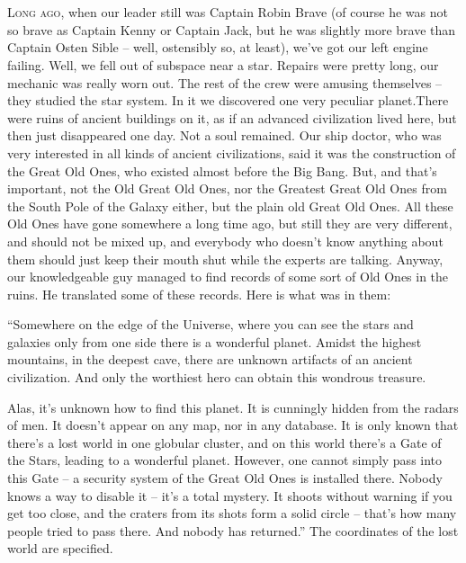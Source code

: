 \documentclass[ebook,twoside,final,openright]{memoir}
\begin{document}
\chapter{}
\par
\lettrine{L}{ong ago,} when our leader still was Captain Robin Brave (of course he was not so brave as Captain Kenny or Captain Jack, but he was slightly more brave than Captain Osten Sible – well, ostensibly so, at least), we’ve got our left engine failing. Well, we fell out of subspace near a star. Repairs were pretty long, our mechanic was really worn out. The rest of the crew were amusing themselves – they studied the star system. In it we discovered one very peculiar planet.There were ruins of ancient buildings on it, as if an advanced civilization lived here, but then just disappeared one day. Not a soul remained. Our ship doctor, who was very interested in all kinds of ancient civilizations, said it was the construction of the Great Old Ones, who existed almost before the Big Bang. But, and that’s important, not the Old Great Old Ones, nor the Greatest Great Old Ones from the South Pole of the Galaxy either, but the plain old Great Old Ones. All these Old Ones have gone somewhere a long time ago, but still they are very different, and should not be mixed up, and everybody who doesn’t know anything about them should just keep their mouth shut while the experts are talking. Anyway, our knowledgeable guy managed to find records of some sort of Old Ones in the ruins. He translated some of these records. Here is what was in them:\par
\par
“Somewhere on the edge of the Universe, where you can see the stars and galaxies only from one side there is a wonderful planet. Amidst the highest mountains, in the deepest cave, there are unknown artifacts of an ancient civilization. And only the worthiest hero can obtain this wondrous treasure. \par
Alas, it’s unknown how to find this planet. It is cunningly hidden from the radars of men. It doesn’t appear on any map, nor in any database. It is only known that there’s a lost world in one globular cluster, and on this world there’s a Gate of the Stars, leading to a wonderful planet. However, one cannot simply pass into this Gate – a security system of the Great Old Ones is installed there. Nobody knows a way to disable it – it’s a total mystery. It shoots without warning if you get too close, and the craters from its shots form a solid circle – that's how many people tried to pass there. And nobody has returned.” The coordinates of the lost world are specified.\par
\end{document}
